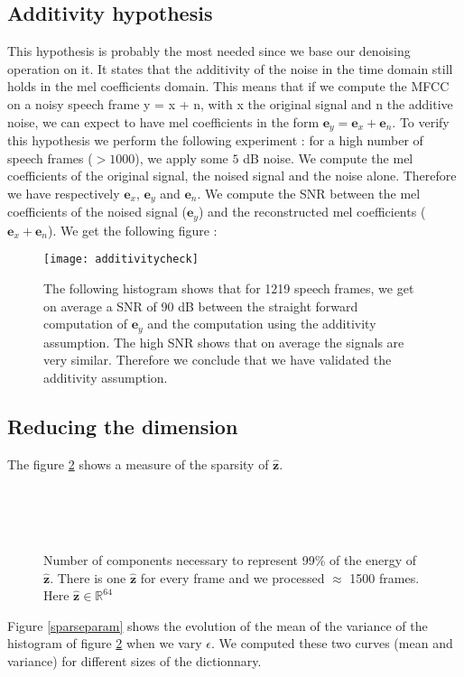 \documentclass[a4paper]{report}
\newcommand{\ey}{\textbf{e}_y}
\newcommand{\ex}{\textbf{e}_x}
\newcommand{\en}{\textbf{e}_n}
\newcommand{\zhat}{ \hat{\textbf{z}} }
\newcommand{\scale}{0.4}
\begin{document}
\subsection{Additivity hypothesis}
This hypothesis is probably the most needed since we base our denoising operation on it. It states that the additivity of the noise in the time domain still holds in the mel coefficients domain.
This means that if we compute the MFCC on a noisy speech frame y = x + n, with x the original signal and n the additive noise, we can expect to have mel coefficients in the form $\ey= \ex + \en$.
To verify this hypothesis we perform the following experiment : for a high number of speech frames ($ > 1000$), we apply some $5$ dB noise. We compute the mel coefficients of the original signal,
the noised signal and the noise alone. Therefore we have respectively $\ex$, $\ey$ and $\en$. We compute the SNR between the mel coefficients of the noised signal ($\ey$) and the reconstructed
mel coefficients ($\ex + \en$). We get the following figure :
\begin{figure}[!ht]
\centering
\texttt{[image: additivitycheck]}\label{sparsemean}
\caption{The following histogram shows that for 1219 speech frames, we get on average a SNR of 90 dB between the straight forward computation of $\ey$ and the computation 
using the additivity assumption. The high SNR shows that on average the signals are very similar. Therefore we conclude that we have validated the additivity assumption.}
\label{additivitycheck}
\end{figure}

\subsection{Reducing the dimension}
The figure \ref{histogram} shows a measure of the sparsity of $\zhat$.

\begin{figure}[!ht]
\centering
     \\
     \\
     \\
     \caption{Number of components necessary to represent 99\% of the energy of $\zhat$. There is one $\zhat$ for every frame and we processed $\approx$ 1500 frames. Here $\zhat \in \mathbb{R}^{64}$}
     \label{histogram}
\end{figure}
Figure \ref{sparseparam} shows the evolution of the mean of the variance of the histogram of figure \ref{histogram} when we vary $\epsilon$. We computed these two curves (mean and variance) for different sizes of the dictionnary. 
\end{document}
